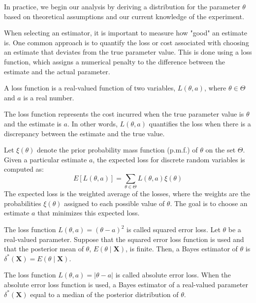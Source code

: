 In practice, we begin our analysis by deriving a distribution for the parameter $\theta$ based on theoretical assumptions and our current knowledge of the experiment.

When selecting an estimator, it is important to measure how "good" an estimate is. One common approach is to quantify the loss or cost associated with choosing an estimate that deviates from the true parameter value. This is done using a loss function, which assigns a numerical penalty to the difference between the estimate and the actual parameter.

\begin{definition}
A loss function is a real-valued function of two variables, $L\left(\theta,a\right)$, where $\theta \in \Theta$ and $a$ is a real number.
\end{definition}

The loss function represents the cost incurred when the true parameter value is $\theta$ and the estimate is $a$. In other words, $L\left(\theta,a\right)$ quantifies the loss when there is a discrepancy between the estimate and the true value.

Let $\xi\left(\theta\right)$ denote the prior probability mass function (p.m.f.) of $\theta$ on the set $\Theta$. Given a particular estimate $a$, the expected loss for discrete random variables is computed as:
\[
E\left[L\left(\theta,a\right)\right]=\sum_{\theta \in \Theta} L\left(\theta,a\right)\xi\left(\theta\right)
\]
The expected loss is the weighted average of the losses, where the weights are the probabilities $\xi(\theta)$ assigned to each possible value of $\theta$. The goal is to choose an estimate $a$ that minimizes this expected loss.

{\color{red}
The loss function $L\left(\theta,a\right)=\left(\theta-a\right)^{2}$ is called squared error loss. Let $\theta$ be a real-valued parameter. Suppose that the squared error loss function is used and that the posterior mean of $\theta$, $E\left(\theta\mid\mathbf{X}\right)$, is finite. Then, a Bayes estimator of $\theta$ is $\delta^{\ast}\left(\mathbf{X}\right)=E\left(\theta\mid\mathbf{X}\right)$.

The loss function $L\left(\theta,a\right)=\left|\theta-a\right|$ is called absolute error loss. When the absolute error loss function is used, a Bayes estimator of a real-valued parameter $\delta^{\ast}\left(\mathbf{X}\right)$ equal to a median of the posterior distribution of $\theta$.
}


